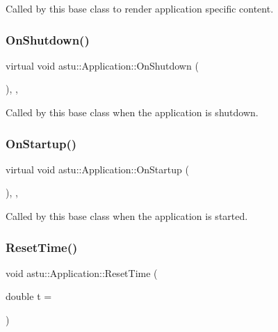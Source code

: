 Called by this base class to render application specific content. \mbox{\label{classastu_1_1Application_a1894a6f4aca54dd7a4c063b614832f3e}} 
\subsubsection{\texorpdfstring{On\+Shutdown()}{OnShutdown()}}
{\footnotesize\ttfamily virtual void astu\+::\+Application\+::\+On\+Shutdown (\begin{DoxyParamCaption}{ }\end{DoxyParamCaption})\hspace{0.3cm}{\ttfamily [inline]}, {\ttfamily [protected]}, {\ttfamily [virtual]}}

Called by this base class when the application is shutdown. \mbox{\label{classastu_1_1Application_a337064e8db0320f0ffe23ed98fc9fd85}} 
\subsubsection{\texorpdfstring{On\+Startup()}{OnStartup()}}
{\footnotesize\ttfamily virtual void astu\+::\+Application\+::\+On\+Startup (\begin{DoxyParamCaption}{ }\end{DoxyParamCaption})\hspace{0.3cm}{\ttfamily [inline]}, {\ttfamily [protected]}, {\ttfamily [virtual]}}

Called by this base class when the application is started. \mbox{\label{classastu_1_1Application_a823b362755043240ba83b785038720ac}} 
\subsubsection{\texorpdfstring{Reset\+Time()}{ResetTime()}}
{\footnotesize\ttfamily void astu\+::\+Application\+::\+Reset\+Time (\begin{DoxyParamCaption}\item[{double}]{t = {} }\end{DoxyParamCaption})}

